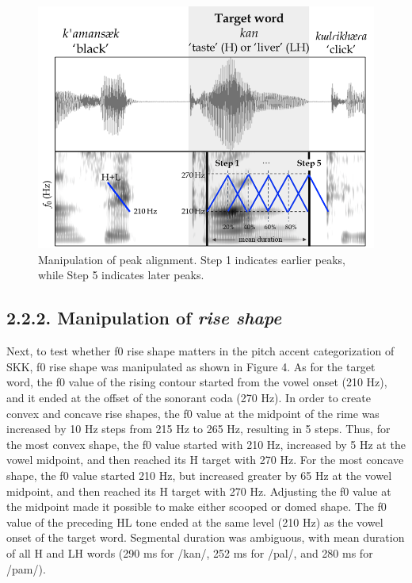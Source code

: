 \documentclass[
  man,floatsintext]{apa6}
\begin{document}
\begin{figure}[H]

{\centering \includegraphics[width=0.7\linewidth]{images/picture3} 

}

\caption{Manipulation of peak alignment. Step 1 indicates earlier peaks, while Step 5 indicates later peaks.}\label{fig:picture3}
\end{figure}

\newpage

\hypertarget{manipulation-of-rise-shape}{%
\subsection{\texorpdfstring{2.2.2. Manipulation of \emph{rise shape}}{2.2.2. Manipulation of rise shape}}\label{manipulation-of-rise-shape}}

Next, to test whether f0 rise shape matters in the pitch accent categorization of SKK, f0 rise shape was manipulated as shown in Figure 4. As for the target word, the f0 value of the rising contour started from the vowel onset (210 Hz), and it ended at the offset of the sonorant coda (270 Hz). In order to create convex and concave rise shapes, the f0 value at the midpoint of the rime was increased by 10 Hz steps from 215 Hz to 265 Hz, resulting in 5 steps. Thus, for the most convex shape, the f0 value started with 210 Hz, increased by 5 Hz at the vowel midpoint, and then reached its H target with 270 Hz. For the most concave shape, the f0 value started 210 Hz, but increased greater by 65 Hz at the vowel midpoint, and then reached its H target with 270 Hz. Adjusting the f0 value at the midpoint made it possible to make either scooped or domed shape. The f0 value of the preceding HL tone ended at the same level (210 Hz) as the vowel onset of the target word. Segmental duration was ambiguous, with mean duration of all H and LH words (290 ms for /kan/, 252 ms for /pal/, and 280 ms for /pam/).
\end{document}
